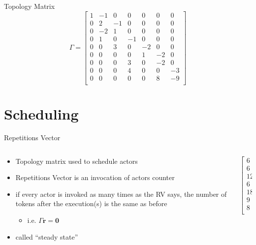 \documentclass{beamer}
\begin{document}
\begin{frame}{Topology Matrix}\
\[
 \Gamma = \begin{bmatrix}
	1 & -1 & 0 & 0 & 0 & 0 & 0 \\
	0 & 2 & -1 & 0 & 0 & 0 & 0 \\
	0 & -2 & 1 & 0 & 0 & 0 & 0 \\
	0 & 1 & 0 & -1 & 0 & 0 & 0 \\
	0 & 0 & 3 & 0 & -2 & 0 & 0 \\
	0 & 0 & 0 & 0 & 1 & -2 & 0 \\
	0 & 0 & 0 & 3 & 0 & -2 & 0 \\
	0 & 0 & 0 & 4 & 0 & 0 & -3 \\
	0 & 0 & 0 & 0 & 0 & 8 & -9 \\
     \end{bmatrix}
\]
\end{frame}

\section{Scheduling}

\begin{frame}{Repetitions Vector}
\begin{columns}
\begin{column}{5cm}
\begin{itemize}
	\item Topology matrix used to schedule actors
	\item Repetitions Vector is an invocation of actors counter
	\item if every actor is invoked as many times as the RV says, the number of tokens after the execution(s) is the same as before
	\begin{itemize}
		\item i.e. $\Gamma \mathbf{r} = \mathbf{0}$
	\end{itemize}
	\item called ``steady state''
\end{itemize}
\end{column}
\begin{column}{5cm}
\begin{center}
\[
\begin{bmatrix}
	6\\
	6\\
	12\\
	6\\
	18\\
	9\\
	8\\
\end{bmatrix}
\]
\end{center}
\end{column}
\end{columns}
\end{frame}
\end{document}
